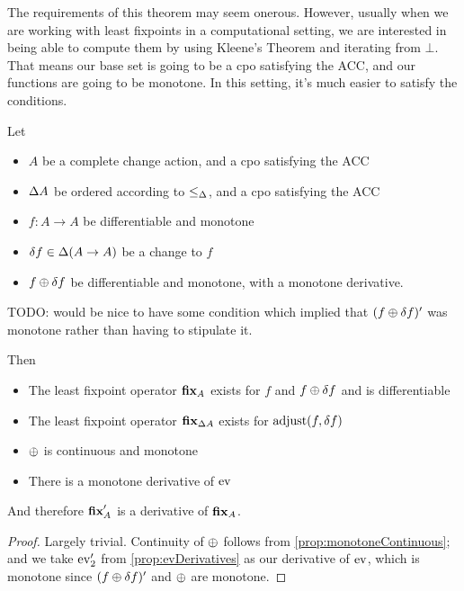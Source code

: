 The requirements of this theorem may seem onerous. However, usually when we are
working with least fixpoints in a computational setting, we are interested in
being able to compute them by using Kleene's Theorem and iterating from $\bot$.
That means our base set is going to be a cpo satisfying the ACC, and our
functions are going to be monotone. In this setting, it's much easier to satisfy
the conditions.

\begin{prop}
  Let
  \begin{itemize}
    \item $A$ be a complete change action, and a cpo satisfying the ACC
    \item $\Delta A$ be ordered according to $\leq_\Delta$, and a cpo
      satisfying the ACC
    \item $f: A \rightarrow A$ be differentiable and monotone
    \item $\delta f \in \Delta (A \rightarrow A)$ be a change to $f$
    \item$f \oplus \delta f$ be differentiable and monotone, with a monotone derivative.
  \end{itemize}

  TODO: would be nice to have some condition which implied that $(f
    \oplus \delta f)'$ was monotone rather than having to stipulate it.

  Then
  \begin{itemize}
    \item The least fixpoint operator $\textbf{fix}_A$ exists for $f$ and $f \oplus
      \delta f$ and is differentiable
    \item The least fixpoint operator $\textbf{fix}_{\Delta A}$ exists for
      $\operatorname{adjust}(f, \delta f)$
    \item $\oplus$ is continuous and monotone
    \item There is a monotone derivative of $\operatorname{ev}$
  \end{itemize}

  And therefore $\textbf{fix}_A'$ is a derivative of $\textbf{fix}_A$.
\end{prop}
\ifproofs
\begin{proof}
  Largely trivial. Continuity of $\oplus$ follows from
  \cref{prop:monotoneContinuous}; and we take $\operatorname{ev}'_2$ from
  \cref{prop:evDerivatives} as our derivative of $\operatorname{ev}$, which is monotone 
  since $(f \oplus \delta f)'$ and $\oplus$ are monotone.
\end{proof}
\fi

